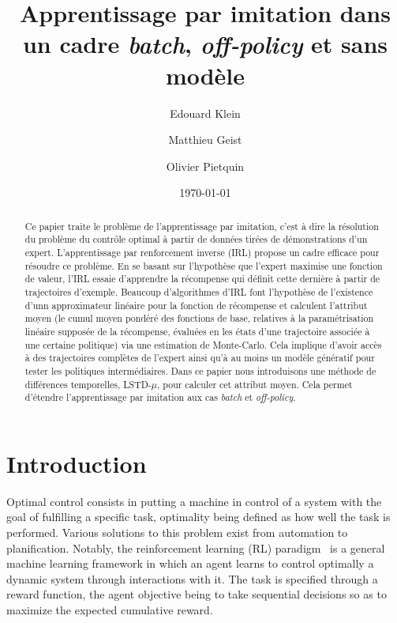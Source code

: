 \documentclass{jfpda2011}
\title{Apprentissage par imitation dans un cadre \emph{batch}, \emph{off-policy} et sans modèle}
\author{Edouard Klein\inst{1}\inst{3} \and Matthieu Geist\inst{1} \and Olivier Pietquin\inst{1}\inst{2}}
\institute{
 1. Supélec-Metz Campus, IMS Research group, France, \texttt{nom.prenom@supelec.fr}\\
 2. UMI 2958 CNRS - GeorgiaTech, France\\
 3. Equipe ABC, LORIA-CNRS, France.
 }
\date{\today}
\begin{document}
\maketitle
\begin{abstract}
 Ce papier traite le problème de l'apprentissage par imitation, c'est à dire la résolution du problème du contrôle optimal à partir de données tirées de démonstrations d'un expert. L'apprentissage par renforcement inverse (IRL) propose un cadre efficace pour résoudre ce problème. En se basant sur l'hypothèse que l'expert maximise une fonction de valeur,  l'IRL essaie d'apprendre la récompense qui définit cette dernière à partir de trajectoires d'exemple. Beaucoup d'algorithmes d'IRL font l'hypothèse de l'existence d'unn approximateur linéaire pour la fonction de récompense et calculent l'attribut moyen (le cumul moyen pondéré des fonctions de base, relatives à la paramétrisation linéaire supposée de la récompense, évaluées en les états d'une trajectoire associée à une certaine politique)  via une estimation de Monte-Carlo. Cela implique d'avoir accès à des trajectoires complètes de l'expert ainsi qu'à au moins un modèle génératif pour tester les politiques intermédiaires. Dans ce papier nous introduisons une méthode de différences temporelles, LSTD-$\mu$, pour calculer cet attribut moyen. Cela permet d'étendre l'apprentissage par imitation aux cas \emph{batch} et \emph{off-policy}.
\end{abstract}
\section{Introduction}

Optimal control consists in putting a machine in control of a system
with the goal of fulfilling a specific task, optimality being
defined as how well the task is performed. Various solutions to this
problem exist from automation to planification. Notably, the
reinforcement learning (RL) paradigm~\citep{sutton1998reinforcement} is a general
machine learning framework in which an agent learns to control
optimally a dynamic system through interactions with it. The task is
specified through a reward function, the agent objective being to
take sequential decisions so as to maximize the expected cumulative
reward.
\end{document}
